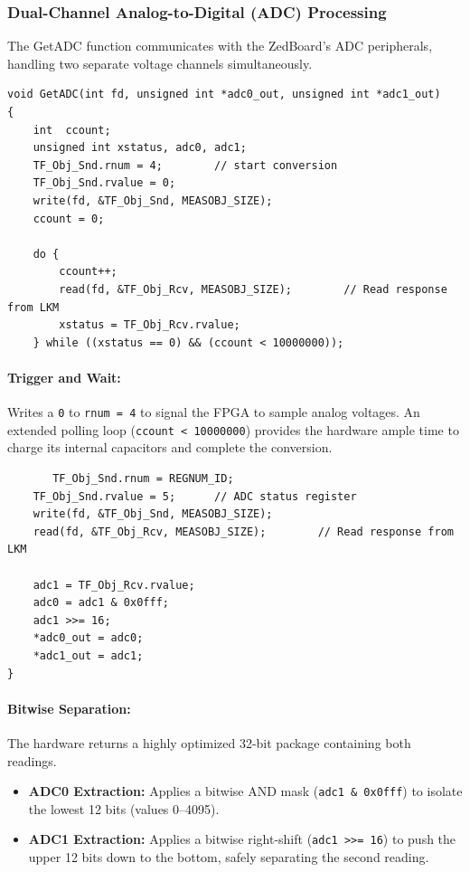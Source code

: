 \subsubsection{Dual-Channel Analog-to-Digital (ADC) Processing}
The GetADC function communicates with the ZedBoard's ADC peripherals, handling two separate voltage channels simultaneously.
\begin{verbatim}
void GetADC(int fd, unsigned int *adc0_out, unsigned int *adc1_out)
{
    int  ccount;
    unsigned int xstatus, adc0, adc1;
    TF_Obj_Snd.rnum = 4;        // start conversion
    TF_Obj_Snd.rvalue = 0;
    write(fd, &TF_Obj_Snd, MEASOBJ_SIZE);
    ccount = 0;
    
    do {
        ccount++;
        read(fd, &TF_Obj_Rcv, MEASOBJ_SIZE);        // Read response from LKM
        xstatus = TF_Obj_Rcv.rvalue;
    } while ((xstatus == 0) && (ccount < 10000000));
\end{verbatim}

\paragraph{Trigger and Wait: }
Writes a \texttt{0} to \texttt{rnum = 4} to signal the FPGA to sample analog voltages. An extended polling loop (\texttt{ccount < 10000000}) provides the hardware ample time to charge its internal capacitors and complete the conversion.
\begin{verbatim}
       TF_Obj_Snd.rnum = REGNUM_ID;
    TF_Obj_Snd.rvalue = 5;      // ADC status register
    write(fd, &TF_Obj_Snd, MEASOBJ_SIZE);
    read(fd, &TF_Obj_Rcv, MEASOBJ_SIZE);        // Read response from LKM
    
    adc1 = TF_Obj_Rcv.rvalue;
    adc0 = adc1 & 0x0fff;
    adc1 >>= 16;
    *adc0_out = adc0;
    *adc1_out = adc1;
}
\end{verbatim}

\paragraph{Bitwise Separation: }
The hardware returns a highly optimized 32-bit package containing both readings.
\begin{itemize}
    \item \textbf{ADC0 Extraction:} Applies a bitwise AND mask (\texttt{adc1 \& 0x0fff}) to isolate the lowest 12 bits (values 0--4095).
    \item \textbf{ADC1 Extraction:} Applies a bitwise right-shift (\texttt{adc1 >>= 16}) to push the upper 12 bits down to the bottom, safely separating the second reading.
\end{itemize}


